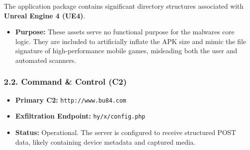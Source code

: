 \documentclass[
]{article}
\begin{document}
The application package contains significant directory structures
associated with \textbf{Unreal Engine 4 (UE4)}.

\begin{itemize}
\item
  \textbf{Purpose:} These assets serve no functional purpose for the
  malware\textquotesingle s core logic. They are included to
  artificially inflate the APK size and mimic the file signature of
  high-performance mobile games, misleading both the user and automated
  scanners.
\end{itemize}

\subsubsection{\texorpdfstring{\textbf{2.2. Command \& Control
(C2)}}{2.2. Command \& Control (C2)}}\label{22-command--control-c2}

\begin{itemize}
\item
  \textbf{Primary C2:} \texttt{http://www.bu84.com}
\item
  \textbf{Exfiltration Endpoint:} \texttt{hy/x/config.php}
\item
  \textbf{Status:} Operational. The server is configured to receive
  structured POST data, likely containing device metadata and captured
  media.
\end{itemize}
\end{document}
